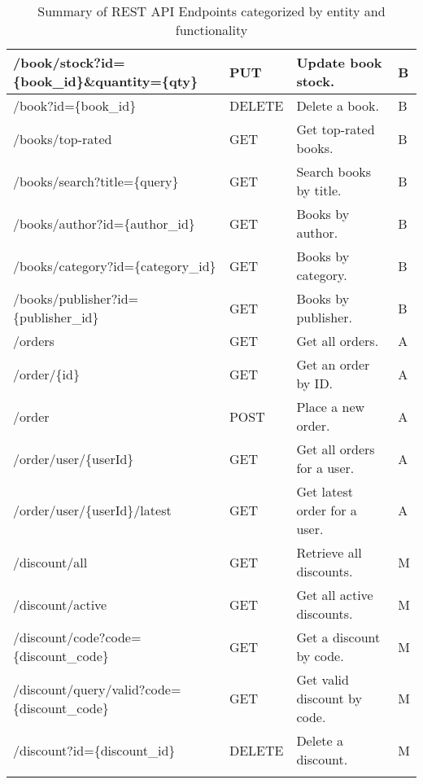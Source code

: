 \begin{longtable}{|p{}|p{} |p{}|p{}|}
\hline
/book/stock?id=\{book\_id\}\&quantity=\{qty\} & PUT & Update book stock. & B \\
\hline
/book?id=\{book\_id\} & DELETE & Delete a book. & B \\
\hline
/books/top-rated & GET & Get top-rated books. & B \\
\hline
/books/search?title=\{query\} & GET & Search books by title. & B \\
\hline
/books/author?id=\{author\_id\} & GET & Books by author. & B \\
\hline
/books/category?id=\{category\_id\} & GET & Books by category. & B \\
\hline
/books/publisher?id=\{publisher\_id\} & GET & Books by publisher. & B \\
\hline
/orders & GET & Get all orders. & A \\
\hline
/order/\{id\} & GET & Get an order by ID. & A \\
\hline
/order & POST & Place a new order. & A \\
\hline
/order/user/\{userId\} & GET & Get all orders for a user. & A \\
\hline
/order/user/\{userId\}/latest & GET & Get latest order for a user. & A \\
\hline
/discount/all & GET & Retrieve all discounts. & M \\
\hline
/discount/active & GET & Get all active discounts. & M \\
\hline
/discount/code?code=\{discount\_code\} & GET & Get a discount by code. & M \\
\hline
/discount/query/valid?code=\{discount\_code\} & GET & Get valid discount by code. & M \\
\hline
/discount?id=\{discount\_id\} & DELETE & Delete a discount. & M \\
\hline

\caption{Summary of REST API Endpoints categorized by entity and functionality}
\label{tab:apiSummary}
\end{longtable}
